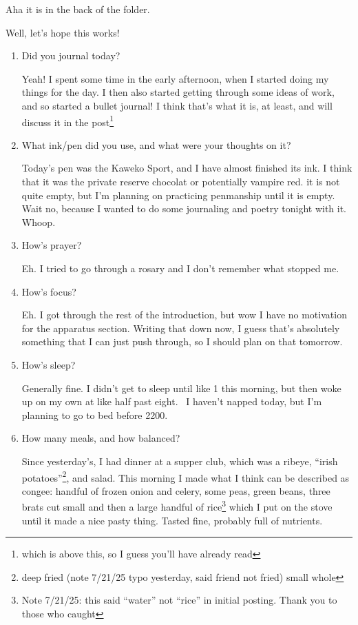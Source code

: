 \documentclass[12pt]{article}
\newcommand{\say}[1]{``#1''}
\renewcommand{\,}{\textsuperscript{,}}
\begin{document}
Aha it is in the back of the folder.

Well, let's hope this works!

\begin{enumerate}

\item Did you journal today?

Yeah! I spent some time in the early afternoon, when I started doing my things for the day.  
I then also started getting through some ideas of work, and so started a bullet journal! I think that's what it is, at least, and will discuss it in the post\footnote{which is above this, so I guess you'll have already read}

\item What ink/pen did you use, and what were your thoughts on it?

Today's pen was the Kaweko Sport, and I have almost finished its ink. I think that it was the private reserve chocolat or potentially vampire red. it is not quite empty, but I'm planning on practicing penmanship until it is empty. Wait no, because I wanted to do some journaling and poetry tonight with it. Whoop.

\item How's prayer?

Eh. I tried to go through a rosary and I don't remember what stopped me.

\item How's focus?

Eh. I got through the rest of the introduction, but wow I have no motivation for the apparatus section. Writing that down now, I guess that's absolutely something that I can just push through, so I should plan on that tomorrow.

\item How's sleep?

Generally fine. I didn't get to sleep until like 1 this morning, but then woke up on my own at like half past eight.   
I haven't napped today, but I'm planning to go to bed before 2200.

\item How many meals, and how balanced?

Since yesterday's, I had dinner at a supper club, which was a ribeye, \say{irish potatoes}\footnote{deep fried (note 7/21/25 typo yesterday, said friend not fried) small whole}, and salad.  
This morning I made what I think can be described as congee: handful of frozen onion and celery, some peas, green beans, three brats cut small and then a large handful of rice\footnote{Note 7/21/25: this said \say{water} not \say{rice} in initial posting. Thank you to those who caught} which I put on the stove until it made a nice pasty thing.  
Tasted fine, probably full of nutrients.


\end{enumerate}
\end{document}
